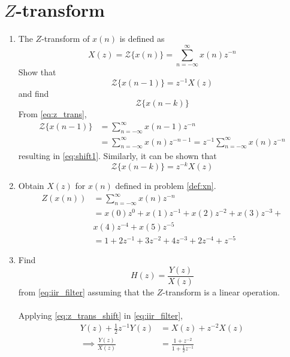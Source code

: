 \documentclass[journal,12pt,twocolumn]{IEEEtran}
\renewcommand\thesection{\arabic{section}}
\begin{document}
\section{$Z$-transform}
\begin{enumerate}[label=\thesection.\arabic*]
\item The $Z$-transform of $x(n)$ is defined as
%
\begin{equation}
\label{z_trans}
X(z)={\mathcal {Z}}\{x(n)\}=\sum _{n=-\infty }^{\infty }x(n)z^{-n}
\end{equation}
%
Show that
\begin{equation}
\label{eq:shift1}
{\mathcal {Z}}\{x(n-1)\} = z^{-1}X(z)
\end{equation}
and find
\begin{equation}
	{\mathcal {Z}}\{x(n-k)\} 
\end{equation}
\solution From \eqref{eq:z_trans},
\begin{align}
{\mathcal {Z}}\{x(n-1)\} &=\sum _{n=-\infty }^{\infty }x(n-1)z^{-n}
\\
&=\sum _{n=-\infty }^{\infty }x(n)z^{-n-1} = z^{-1}\sum _{n=-\infty }^{\infty }x(n)z^{-n}
\end{align}
resulting in \eqref{eq:shift1}. Similarly, it can be shown that
%
\begin{equation}
\label{eq:z_trans_shift}
	{\mathcal {Z}}\{x(n-k)\} = z^{-k}X(z)
\end{equation}
\item Obtain $X(z)$ for $x(n)$ defined in problem  \ref{def:xn}.
\solution
\begin{align}
Z(x(n))&=\sum_{n=-\infty}^{\infty}x(n)z^{-n}\\
&=x(0)z^{0}+x(1)z^{-1}+x(2)z^{-2}+x(3)z^{-3}+\\
&\nonumber x(4)z^{-4}+x(5)z^{-5}\\
&=1+2z^{-1}+3z^{-2}+4z^{-3}+2z^{-4}+z^{-5}
\end{align}
\item Find
%
\begin{equation}
H(z) = \frac{Y(z)}{X(z)}
\end{equation}
%
from  \eqref{eq:iir_filter} assuming that the $Z$-transform is a linear operation.
\\
\solution 
\\
Applying \eqref{eq:z_trans_shift} in \eqref{eq:iir_filter},
\begin{align}
Y(z) + \frac{1}{2}z^{-1}Y(z) &= X(z)+z^{-2}X(z)
\\
\implies \frac{Y(z)}{X(z)} &= \frac{1 + z^{-2}}{1 + \frac{1}{2}z^{-1}}

\end{align}
\end{enumerate}
\end{document}
